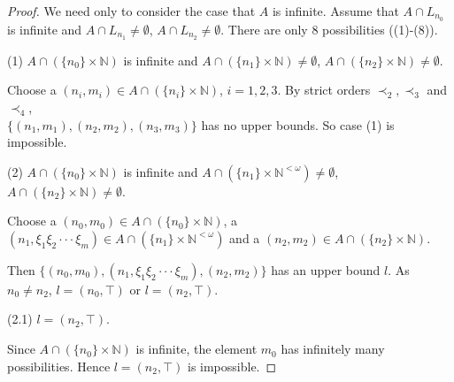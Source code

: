 \documentclass[preprint,12pt]{elsarticle}
\numberwithin{equation}{section}
\begin{document}
\begin{proof}We need only to consider the case that $A$ is infinite. Assume that $A\cap L_{n_{0}}$ is infinite and $A\cap L_{n_{1}}\neq\emptyset$, $A\cap L_{n_{2}}\neq\emptyset$. There are only 8 possibilities ((1)-(8)).

(1) $A\cap(\{n_{0}\}\times\mathbb{N})$ is infinite and $A\cap(\{n_{1}\}\times\mathbb{N})\neq\emptyset$, $A\cap(\{n_{2}\}\times\mathbb{N})\neq\emptyset$.

Choose a $(n_{i},m_{i})\in A\cap(\{n_{i}\}\times\mathbb{N})$, $i=1,2,3$.  By strict orders $\prec_{2},\prec_{3} $ and $\prec_{4}$,\\ $\{(n_{1},m_{1}),(n_{2},m_{2}),(n_{3},m_{3})\}$ has no upper bounds. So case (1) is impossible.

(2) $A\cap(\{n_{0}\}\times\mathbb{N})$ is infinite and $A\cap(\{n_{1}\}\times\mathbb{N}^{<\omega})\neq\emptyset$, $A\cap(\{n_{2}\}\times\mathbb{N})\neq\emptyset$.

Choose a $(n_{0},m_{0})\in A\cap(\{n_{0}\}\times\mathbb{N})$, a $(n_{1},\xi_{1}\xi_{2}\cdot\cdot\cdot\xi_{m})\in A\cap(\{n_{1}\}\times\mathbb{N}^{<\omega})$ and a $(n_{2},m_{2})\in A\cap(\{n_{2}\}\times\mathbb{N})$.

Then $\{(n_{0},m_{0}),(n_{1},\xi_{1}\xi_{2}\cdot\cdot\cdot\xi_{m}),(n_{2},m_{2})\}$ has an upper bound $l$. As $n_{0}\neq n_{2}$, $l=(n_{0},\top)$ or $l=(n_{2},\top)$.



(2.1) $l=(n_{2},\top)$.

Since $A\cap(\{n_{0}\}\times\mathbb{N})$ is infinite, the element $m_{0}$ has infinitely many possibilities. Hence $l=(n_{2},\top)$ is impossible.






\end{proof}
\end{document}
